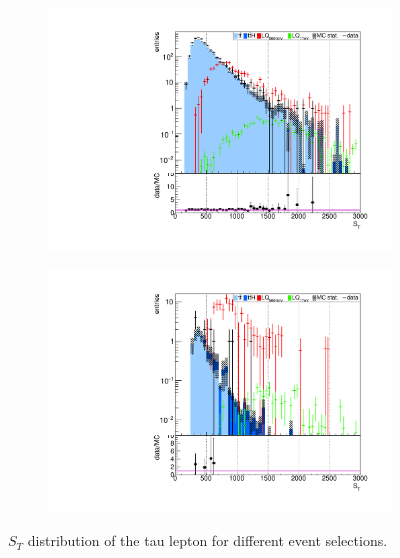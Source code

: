 \begin{figure}
\begin{subfigure}[t]{0.49\textwidth}
                \end{subfigure}
                \begin{subfigure}[t]{0.49\textwidth}
                \includegraphics[width=\textwidth]{figures/plots/kinLQ75/ST_2j1b_1tau.pdf}
                \label{ST:1b1tau}
                \end{subfigure}
                \begin{subfigure}[t]{0.49\textwidth}
                \includegraphics[width=\textwidth]{figures/plots/kinLQ75/ST_2j1b_2tau.pdf}
                \label{ST:1b2tau}
                \end{subfigure}
\caption[$S_T$ distribution of the tau lepton for different event selections.]{$S_T$ distribution of the tau lepton for different event selections.}
\label{ST}
\end{figure}
